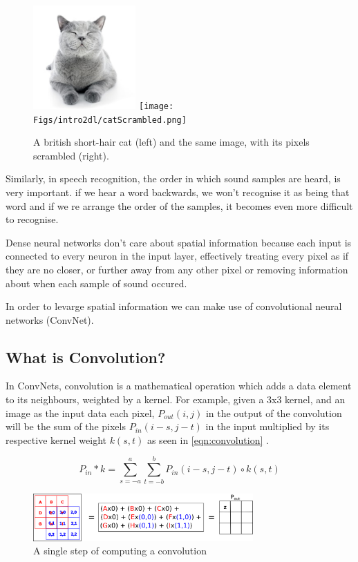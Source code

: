 \begin{figure}
	\centering
	\includegraphics[width=0.35\textwidth]{Figs/intro2dl/cat.png}
	\texttt{[image: Figs/intro2dl/catScrambled.png]}
	
	\caption{A british short-hair cat (left) and the same image, with its pixels scrambled (right).}
	\label{fig:cat}
\end{figure}

Similarly, in speech recognition, the order in which sound samples are heard, is very important. if we hear a word backwards, we won't recognise it as being that word and if we re arrange the order of the samples, it becomes even more difficult to recognise.

Dense neural networks don't care about spatial information because each input is connected to every neuron in the input layer, effectively treating every pixel as if they are no closer, or further away from any other pixel or removing information about when each sample of sound occured.

In order to levarge spatial information we can make use of convolutional neural networks (ConvNet).

\subsection{What is Convolution?}
In ConvNets, convolution is a mathematical operation which adds a data element to its neighbours, weighted by a kernel. For example, given a 3x3 kernel, and an image as the input data each pixel, $P_{out}(i,j)$ in the output of the convolution will be the sum of the pixels $P_{in}(i-s, j-t)$ in the input  multiplied by its respective kernel weight $k(s,t)$ as seen in \autoref{eqn:convolution} \cite{dumoulin2016guide}.

\begin{equation} \label{eqn:convolution}
P_{in}*k = \sum_{s=-a}^{a}\sum_{t=-b}^{b} P_{in}(i-s, j-t) \circ k(s,t)
\end{equation}

\begin{figure}
	\centering	\includegraphics[width=0.75\textwidth]{Figs/intro2dl/convolutionSingleStep.png}
	\caption{A single step of computing a convolution }
	\label{fig:oneStepConv}
\end{figure}

